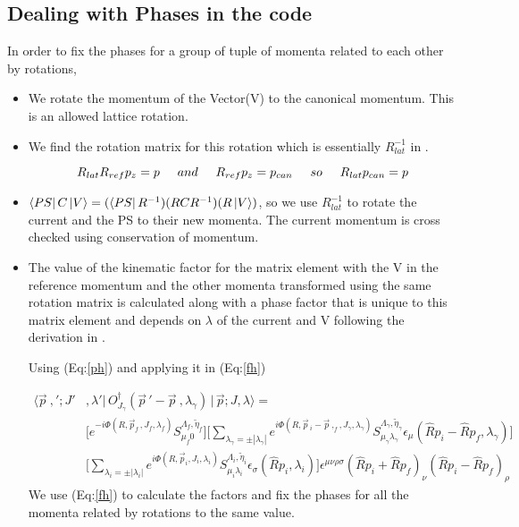 \documentclass[10pt]{article}
\begin{document}
\subsection{Dealing with Phases in the code}
In order to fix the phases for a group of tuple of momenta related to each other by rotations,
\begin{itemize}
 	\item We rotate the momentum of the Vector(V) to the canonical momentum. This is an allowed lattice rotation.
	\item We find the rotation matrix for this rotation which is essentially $R_{lat}^{-1}$ in \cite{hel}.

\begin{equation}
R_{lat}R_{ref}p_z = p \hspace{5mm}and\hspace{5mm} R_{ref}p_z = p_{can} \hspace{5mm}so\hspace{5mm} R_{lat}p_{can} = p
\label{rot_mat}
\end{equation}
	
	\item $\bra{PS}C\ket{V} = (\bra{PS}R^{-1})(RCR^{-1})(R\ket{V}) $, so we use $R_{lat}^{-1}$ to rotate the current and the PS to their new momenta. The current momentum is cross checked using conservation of momentum.
	\item The value of the kinematic factor for the matrix element with the V in the reference momentum and the other momenta transformed using the same rotation matrix is calculated along with a phase factor that is unique to this matrix element and depends on $\lambda$ of the current and V following the derivation in \cite{shultz}. \par
	Using (Eq:\ref{ph}) and applying it in  (Eq:\ref{fh})

\begin{align*}
\label{fh}
\big\langle \vec{p}\ ,'; J'& ,\lambda'  \big| \, O_{J_\gamma}^{\dagger}(\vec{p}\,' - \vec{p}\ ,\lambda_{\gamma}) \, \big| \, \vec{p}; J, \lambda  \big\rangle = \\
&\Big[ e^{-i \Phi(R, \vec{p}_f\,, J_f, \lambda_f)} S^{ \Lambda_f,\tilde{\eta}_f  }_{\mu_f 0} \Big] 
\Big[ \sum_{\lambda_{\gamma} = \pm|\lambda_{\gamma}|} e^{i \Phi(R, \vec{p}\,_i - \vec{p}\ ,_f, J_{\gamma}, \lambda_{\gamma})} S^{ \Lambda_{\gamma},\tilde{\eta}_{\gamma}  }_{\mu_{\gamma} \lambda_{\gamma} } \epsilon_{\mu}(\hat{R}p_i - \hat{R}p_f, \lambda_{\gamma})\Big ] \\
&\Big[  \sum_{\lambda_i = \pm|\lambda_i| } e^{i \Phi(R, \vec{p}_i, J_i, \lambda_i)} S^{ \Lambda_i,\tilde{\eta}_i  }_{\mu_i\lambda_i} \epsilon_{\sigma}(\hat{R}p_i, \lambda_i) \Big]  \epsilon^{\mu\nu\rho\sigma}(\hat{R}p_i + \hat{R}p_f)_{\nu}(\hat{R}p_i - \hat{R}p_f)_{\rho}
\end{align*}
We use (Eq:\ref{fh}) to calculate the factors and fix the phases for all the momenta related by rotations to the same value.	
\end{itemize}
\end{document}
